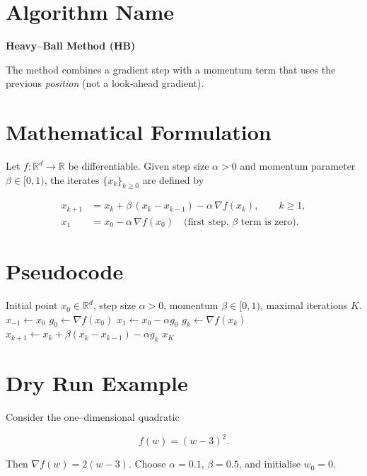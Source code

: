 \documentclass{article}
\newcommand{\R}{\mathbb{R}}
\begin{document}
\section*{Algorithm Name}
\textbf{Heavy–Ball Method (HB)}  

The method combines a gradient step with a momentum term that uses the previous \emph{position} (not a look‑ahead gradient).  

\section*{Mathematical Formulation}
Let $f:\R^{d}\rightarrow\R$ be differentiable.  
Given step size $\alpha>0$ and momentum parameter $\beta\in[0,1)$, the iterates $\{x_k\}_{k\ge 0}$ are defined by  

\[
\boxed{
\begin{aligned}
x_{k+1}&=x_k+\beta\,(x_k-x_{k-1})-\alpha \,\nabla f(x_k),\qquad k\ge 1,\\
x_1    &=x_0-\alpha \,\nabla f(x_0) \quad\text{(first step, $\beta$ term is zero)} .
\end{aligned}}
\]

\section*{Pseudocode}
\begin{algorithm}[H]
\caption{Heavy–Ball (HB)}
\begin{algorithmic}[1]
\REQUIRE Initial point $x_0\in\R^{d}$, step size $\alpha>0$, momentum $\beta\in[0,1)$, maximal iterations $K$.
\STATE $x_{-1}\gets x_0$ 
\STATE $g_0 \gets \nabla f(x_0)$
\STATE $x_1 \gets x_0-\alpha g_0$
    \STATE $g_k \gets \nabla f(x_k)$
    \STATE $x_{k+1}\gets x_k+\beta (x_k-x_{k-1})-\alpha g_k$
\ENDFOR
\RETURN $x_K$
\end{algorithmic}
\end{algorithm}

\section*{Dry Run Example}
Consider the one–dimensional quadratic  

\[
f(w)=(w-3)^2 .
\]

Then $\nabla f(w)=2(w-3)$.  
Choose $\alpha=0.1$, $\beta=0.5$, and initialise $w_0=0$.
\end{document}
